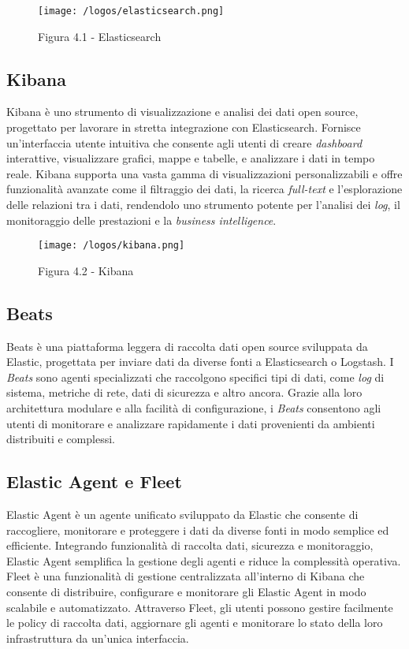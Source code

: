 \begin{figure}[H] 
    \centering 
    \texttt{[image: /logos/elasticsearch.png]} 
    \caption{Figura 4.1 - Elasticsearch}
\end{figure}


\subsection*{Kibana}
Kibana è uno strumento di visualizzazione e analisi dei dati open source, progettato per lavorare in stretta integrazione con Elasticsearch. Fornisce un'interfaccia utente intuitiva che consente agli utenti di creare \emph{dashboard} interattive, visualizzare grafici, mappe e tabelle, e analizzare i dati in tempo reale. Kibana supporta una vasta gamma di visualizzazioni personalizzabili e offre funzionalità avanzate come il filtraggio dei dati, la ricerca \emph{full-text} e l'esplorazione delle relazioni tra i dati, rendendolo uno strumento potente per l'analisi dei \emph{log}, il monitoraggio delle prestazioni e la \emph{business intelligence}.

\begin{figure}[H] 
    \centering 
    \texttt{[image: /logos/kibana.png]} 
    \caption{Figura 4.2 - Kibana}
\end{figure}


\subsection*{Beats}
Beats è una piattaforma leggera di raccolta dati open source sviluppata da Elastic, progettata per inviare dati da diverse fonti a Elasticsearch o Logstash. I \emph{Beats} sono agenti specializzati che raccolgono specifici tipi di dati, come \emph{log} di sistema, metriche di rete, dati di sicurezza e altro ancora. Grazie alla loro architettura modulare e alla facilità di configurazione, i \emph{Beats} consentono agli utenti di monitorare e analizzare rapidamente i dati provenienti da ambienti distribuiti e complessi.


\subsection*{Elastic Agent e Fleet}
Elastic Agent è un agente unificato sviluppato da Elastic che consente di raccogliere, monitorare e proteggere i dati da diverse fonti in modo semplice ed efficiente. Integrando funzionalità di raccolta dati, sicurezza e monitoraggio, Elastic Agent semplifica la gestione degli agenti e riduce la complessità operativa. Fleet è una funzionalità di gestione centralizzata all'interno di Kibana che consente di distribuire, configurare e monitorare gli Elastic Agent in modo scalabile e automatizzato. Attraverso Fleet, gli utenti possono gestire facilmente le policy di raccolta dati, aggiornare gli agenti e monitorare lo stato della loro infrastruttura da un'unica interfaccia.



